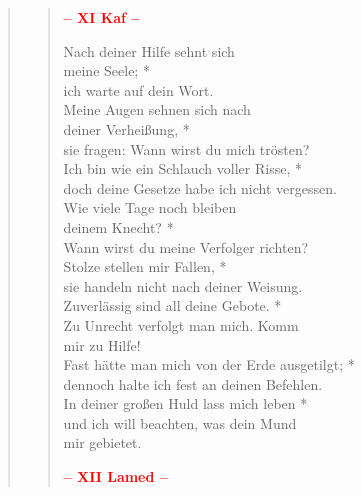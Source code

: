 




\begin{quote}
\begin{verse}

\begin{center}
 \textcolor{red}{\normalsize\bf – XI Kaf –}\\
\end{center} 

 Nach deiner Hilfe sehnt sich\\ meine Seele; *\\
ich warte auf dein Wort.\\ \vin 
Meine Augen sehnen sich nach\\ \vin deiner Verheißung, *\\ \vin
sie fragen: Wann wirst du mich trösten? \\
Ich bin wie ein Schlauch voller Risse, *\\
doch deine Gesetze habe ich nicht vergessen.\\ \vin 
Wie viele Tage noch bleiben\\ \vin  deinem Knecht? *\\ \vin
Wann wirst du meine Verfolger richten?\\
Stolze stellen mir Fallen, *\\
sie handeln nicht nach deiner Weisung.\\ \vin
Zuverlässig sind all deine Gebote. *\\ \vin
Zu Unrecht verfolgt man mich. Komm\\ \vin  mir zu Hilfe!\\
Fast hätte man mich von der Erde ausgetilgt; *\\
dennoch halte ich fest an deinen Befehlen.\\ \vin
In deiner großen Huld lass mich leben *\\ \vin
und ich will beachten, was dein Mund \\ \vin mir gebietet.\\                        

\begin{center}
 \textcolor{red}{\normalsize\bf – XII Lamed –}\\
\end{center} 


\end{verse}
\end{quote}

